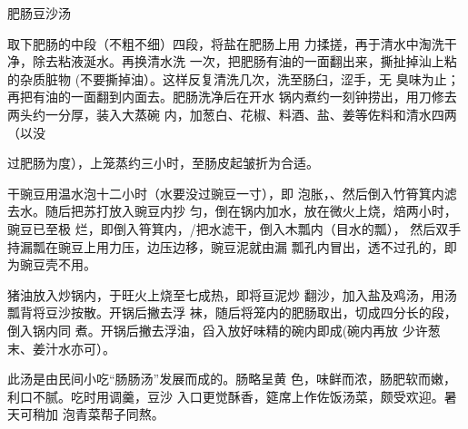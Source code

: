 \begin{recipe}{肥肠豆沙汤}

\ingredients




\cooking

\step 取下肥肠的中段（不粗不细）四段，将盐在肥肠上用 力揉搓，再于清水中淘洗干净，除去粘液涎水。再换清水洗 一次，把肥肠有油的一面翻出来，撕扯掉汕上粘的杂质脏物 (不要撕掉油）。这样反复清洗几次，洗至肠臼，涩手，无 臭味为止；再把有油的一面翻到内面去。肥肠洗净后在开水 锅内煮约一刻钟捞出，用刀修去两头约一分厚，装入大蒸碗 内，加葱白、花椒、料酒、盐、姜等佐料和清水四两（以没

过肥肠为度），上笼蒸约三小时，至肠皮起皱折为合适。

\step 干豌豆用温水泡十二小时（水要没过豌豆一寸），即 泡胀，、然后倒入竹筲箕内滤去水。随后把苏打放入豌豆内抄 匀，倒在锅内加水，放在微火上烧，焙两小时，豌豆已至极 烂，即倒入筲箕内，/把水滤干，倒入木瓢内（目水的瓢）， 然后双手持漏瓢在豌豆上用力压，边压边移，豌豆泥就由漏 瓢孔内冒出，透不过孔的，即为豌豆壳不用。

\step 猪油放入炒锅内，于旺火上烧至七成热，即将亘泥炒 翻沙，加入盐及鸡汤，用汤瓢背将豆沙按散。开锅后撇去浮 袜，随后将笼内的肥肠取出，切成四分长的段，倒入锅内同 煮。开锅后撇去浮油，舀入放好味精的碗内即成(碗内再放 少许葱末、姜汁水亦可）。

\notes

此汤是由民间小吃“肠肠汤”发展而成的。肠略呈黄 色，味鲜而浓，肠肥软而嫩，利口不腻。吃时用调羹，豆沙 入口更觉酥香，筵席上作佐饭汤菜，颇受欢迎。暑天可稍加 泡青菜帮子同熬。

\end{recipe}

